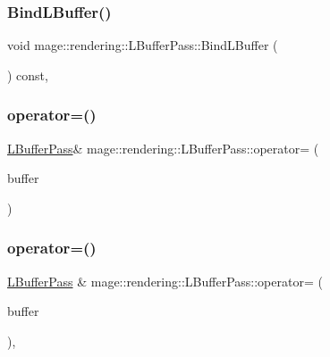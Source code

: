 \subsubsection{\texorpdfstring{Bind\+L\+Buffer()}{BindLBuffer()}}
{\footnotesize\ttfamily void mage\+::rendering\+::\+L\+Buffer\+Pass\+::\+Bind\+L\+Buffer (\begin{DoxyParamCaption}{ }\end{DoxyParamCaption}) const\hspace{0.3cm}{\ttfamily [private]}, {\ttfamily [noexcept]}}

\hypertarget{classmage_1_1rendering_1_1_l_buffer_pass_a14814e64f1e99f3144944bea07932a20}{}\label{classmage_1_1rendering_1_1_l_buffer_pass_a14814e64f1e99f3144944bea07932a20} 
\subsubsection{\texorpdfstring{operator=()}{operator=()}\hspace{0.1cm}{\footnotesize\ttfamily [1/2]}}
{\footnotesize\ttfamily \hyperlink{classmage_1_1rendering_1_1_l_buffer_pass}{L\+Buffer\+Pass}\& mage\+::rendering\+::\+L\+Buffer\+Pass\+::operator= (\begin{DoxyParamCaption}\item[{const \hyperlink{classmage_1_1rendering_1_1_l_buffer_pass}{L\+Buffer\+Pass} \&}]{buffer }\end{DoxyParamCaption})\hspace{0.3cm}{\ttfamily [delete]}}

\hypertarget{classmage_1_1rendering_1_1_l_buffer_pass_aeab4dadf9d131fbfaadb28acfde5c575}{}\label{classmage_1_1rendering_1_1_l_buffer_pass_aeab4dadf9d131fbfaadb28acfde5c575} 
\subsubsection{\texorpdfstring{operator=()}{operator=()}\hspace{0.1cm}{\footnotesize\ttfamily [2/2]}}
{\footnotesize\ttfamily \hyperlink{classmage_1_1rendering_1_1_l_buffer_pass}{L\+Buffer\+Pass} \& mage\+::rendering\+::\+L\+Buffer\+Pass\+::operator= (\begin{DoxyParamCaption}\item[{\hyperlink{classmage_1_1rendering_1_1_l_buffer_pass}{L\+Buffer\+Pass} \&\&}]{buffer }\end{DoxyParamCaption})\hspace{0.3cm}{\ttfamily [default]}, {\ttfamily [noexcept]}}


